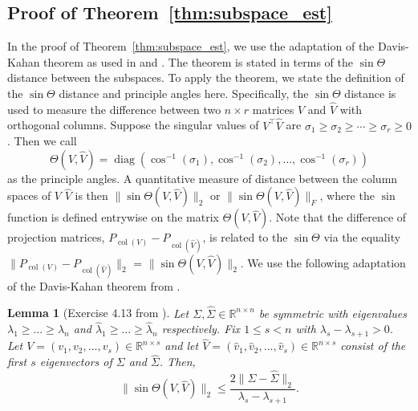 \documentclass{amsart}
\DeclareMathOperator*{\col}{col}
\newtheorem{lemma}[theorem]{Lemma}
\begin{document}
\subsection{Proof of Theorem~\ref{thm:subspace_est}
}

In the proof of Theorem~\ref{thm:subspace_est}, we use the adaptation of the Davis-Kahan theorem as used in \citet{yu2015useful} and \citet{vershyninHighDimensionalProbabilityIntroduction2025}. The theorem is stated in terms of the $\sin\Theta$ distance between the subspaces. To apply the theorem, we state the definition of the $\sin \Theta$ distance and principle angles here. Specifically, the $\sin \Theta$ distance is used to measure the difference between two $n \times r$ matrices $V$ and $\widehat{V}$  with orthogonal columns. Suppose the singular values of $V^\top \widehat{V}$ are $\sigma_1 \geq \sigma_2 \geq \cdots \geq \sigma_r \geq 0$. Then we call
\[
\Theta(V, \widehat{V}) = \operatorname{diag}(\cos^{-1}(\sigma_1), \cos^{-1}(\sigma_2), \dots, \cos^{-1}(\sigma_r))
\]
as the principle angles. A quantitative measure of distance between the column spaces of $V$  $\widehat{V}$ is then $\|\sin \Theta(V, \widehat{V})\|_2$ or $\|\sin \Theta(V, \widehat{V})\|_F$, where the $\sin$ function is defined entrywise on the matrix $\Theta(V, \widehat{V})$. Note that the difference of projection matrices, $P_{\col(V)} - P_{\col(\widehat{V})}$, is related to the $\sin\Theta$ via the equality $\| P_{\col({V})} - P_{\col(\widehat{V})}\|_2$ = $\|\sin \Theta(V , \widehat{V})\|_2$. {We use the following adaptation of the Davis-Kahan theorem from \citet{vershyninHighDimensionalProbabilityIntroduction2025}.}%


{
\begin{lemma}[Exercise 4.13 from \citet{vershyninHighDimensionalProbabilityIntroduction2025}]\label{lemma_kahan}Let $\Sigma,\widehat{\Sigma} \in \mathbb{R}^{n \times n}$ be symmetric with eigenvalues $\lambda_1 \geq \dots \geq \lambda_{n}$ and $\widehat{\lambda}_1 \geq \dots \geq \widehat{\lambda}_n$ respectively. Fix $1 \leq s <n$ with $\lambda_{s} - \lambda_{s+1}>0$. Let $V = (v_1,v_{2},\dots,v_s)\in\mathbb{R}^{n \times s}$ and let $\widehat{V} = (\widehat{v}_1,\widehat{v}_{2},\dots,\widehat{v}_{s}) \in \mathbb{R}^{n \times s}$ consist of the first $s$ eigenvectors of $\Sigma$ and $\widehat{\Sigma}$. Then,
$$ \|\sin \Theta(V, \widehat{V})\|_2 \leq \frac{2\|\Sigma - \widehat{\Sigma}\|_2}{\lambda_{s}-\lambda_{s+1}}.$$
\end{lemma}
}
\end{document}
